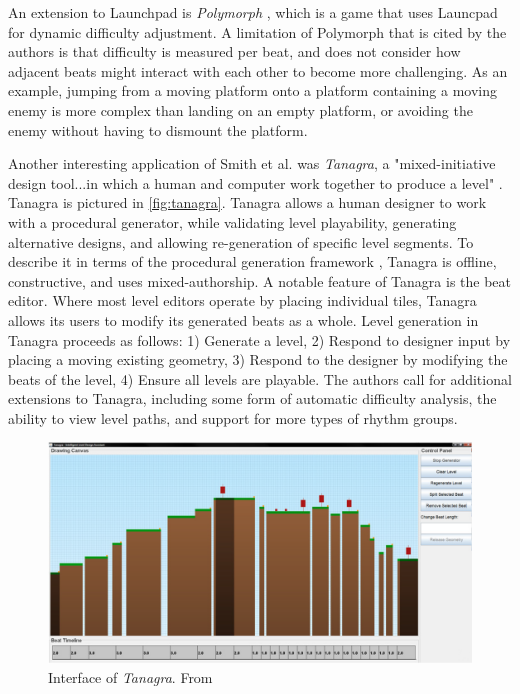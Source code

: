 An extension to Launchpad is \emph{Polymorph} \cite{jennings-teats2010}, which is a game
that uses Launcpad for dynamic difficulty adjustment. A limitation of Polymorph that is
cited by the authors is that difficulty is measured per beat, and does not consider how
adjacent beats might interact with each other to become more challenging. As an example,
jumping from a moving platform onto a platform containing a moving enemy is more complex
than landing on an empty platform, or avoiding the enemy without having to dismount the
platform.

Another interesting application of Smith et al. was \emph{Tanagra}, a "mixed-initiative
design tool...in which a human and computer work together to produce a level" 
\cite{smith2010}. Tanagra is pictured in \autoref{fig:tanagra}. Tanagra allows a human
designer to work with a procedural generator, while validating level playability, generating
alternative designs, and allowing re-generation of specific level segments. To describe it
in terms of the procedural generation framework \cite{togelius2011}, Tanagra is offline,
constructive, and uses mixed-authorship. A notable feature of Tanagra is the beat editor.
Where most level editors operate by placing individual tiles, Tanagra allows its users to
modify its generated beats as a whole. Level generation in Tanagra proceeds as follows:
1) Generate a level, 2) Respond to designer input by placing a moving existing geometry, 3)
Respond to the designer by modifying the beats of the level, 4) Ensure all levels are
playable. The authors call for additional extensions to Tanagra, including some form of
automatic difficulty analysis, the ability to view level paths, and support for more types
of rhythm groups.

\begin{figure}[h]
    \centering
    \includegraphics[width=\linewidth]{img/fig6-tanagra.png}
    \caption{Interface of \emph{Tanagra}. From \cite{smith2010}}
    \label{fig:tanagra}
\end{figure}

